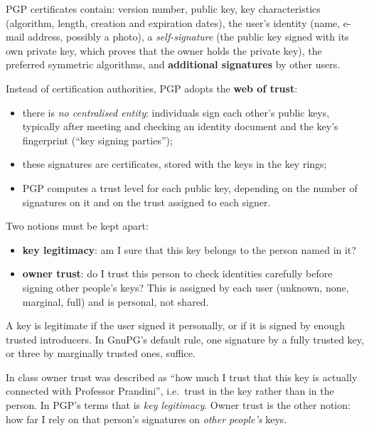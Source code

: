 PGP certificates contain: version number, public key, key characteristics (algorithm, length, creation and expiration dates), the user's identity (name, e-mail address, possibly a photo), a \emph{self-signature} (the public key signed with its own private key, which proves that the owner holds the private key), the preferred symmetric algorithms, and \textbf{additional signatures} by other users.

Instead of certification authorities, PGP adopts the \textbf{web of trust}:
\begin{itemize}
    \item there is \emph{no centralised entity}: individuals sign each other's public keys, typically after meeting and checking an identity document and the key's fingerprint (\enquote{key signing parties});
    \item these signatures are certificates, stored with the keys in the key rings;
    \item PGP computes a trust level for each public key, depending on the number of signatures on it and on the trust assigned to each signer.
\end{itemize}
Two notions must be kept apart:
\begin{itemize}
    \item \textbf{key legitimacy}: am I sure that this key belongs to the person named in it?
    \item \textbf{owner trust}: do I trust this person to check identities carefully before signing other people's keys? This is assigned by each user (unknown, none, marginal, full) and is personal, not shared.
\end{itemize}
A key is legitimate if the user signed it personally, or if it is signed by enough trusted introducers. In GnuPG's default rule, one signature by a fully trusted key, or three by marginally trusted ones, suffice.

\begin{remark}
In class owner trust was described as \enquote{how much I trust that this key is actually connected with Professor Prandini}, i.e.\ trust in the key rather than in the person. In PGP's terms that is \emph{key legitimacy}. Owner trust is the other notion: how far I rely on that person's signatures on \emph{other people's} keys.
\end{remark}

